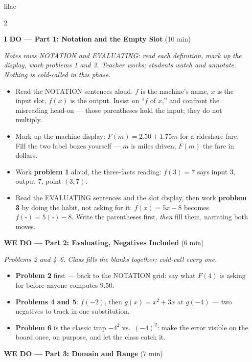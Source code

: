 \documentclass[10pt]{article}
\begin{document}
\begin{skillbox}{lilac}
\begin{multicols}{2}

\textbf{I DO --- Part 1: Notation and the Empty Slot} (10 min)

\textit{Notes rows NOTATION and EVALUATING: read each definition, mark up the
display, work problems 1 and 3. Teacher works; students watch and annotate.
Nothing is cold-called in this phase.}
\begin{itemize}
  \item Read the NOTATION sentences aloud: $f$ is the machine's name, $x$ is the
        input slot, $f(x)$ is the output. Insist on ``$f$ of $x$,'' and confront
        the misreading head-on --- those parentheses hold the input; they do not
        multiply.
  \item Mark up the machine display: $F(m) = 2.50 + 1.75m$ for a rideshare fare.
        Fill the two label boxes yourself --- $m$ is miles driven, $F(m)$ the fare
        in dollars.
  \item Work \textbf{problem 1} aloud, the three-facts reading: $f(3) = 7$ says
        input 3, output 7, point $(3,7)$.
  \item Read the EVALUATING sentences and the slot display, then work
        \textbf{problem 3} by doing the habit, not asking for it:
        $f(x) = 5x - 8$ becomes $f(\square) = 5(\square) - 8$. Write the
        parentheses first, \textit{then} fill them, narrating both moves.
\end{itemize}

\textbf{WE DO --- Part 2: Evaluating, Negatives Included} (6 min)

\textit{Problems 2 and 4--6. Class fills the blanks together; cold-call every one.}
\begin{itemize}
  \item \textbf{Problem 2} first --- back to the NOTATION grid: say what $F(4)$
        is asking for before anyone computes 9.50.
  \item \textbf{Problems 4 and 5}: $f(-2)$, then $g(x) = x^2 + 3x$ at $g(-4)$ ---
        two negatives to track in one substitution.
  \item \textbf{Problem 6} is the classic trap $-4^2$ vs.\ $(-4)^2$: make the
        error visible on the board once, on purpose, and let the class catch it.
\end{itemize}

\columnbreak

\textbf{WE DO --- Part 3: Domain and Range} (7 min)


\end{multicols}
\end{skillbox}
\end{document}
